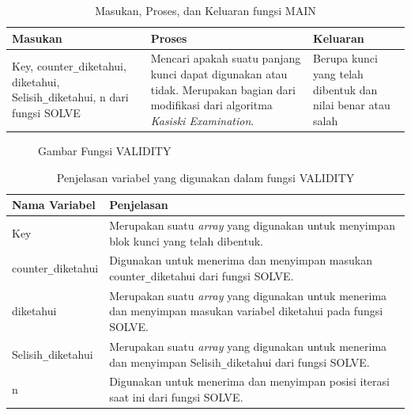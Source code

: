 		\begin{table}[H]
	 	\caption{Masukan, Proses, dan Keluaran fungsi MAIN}
		\begin{tabular}   {|p{3cm}|p{4cm}|p{2cm}|}\hline
		Masukan&Proses&Keluaran \\ \hline
		Key, counter\verb|_|diketahui, diketahui, Selisih\verb|_|diketahui, n dari fungsi SOLVE&Mencari apakah suatu panjang kunci dapat digunakan atau tidak. Merupakan bagian dari modifikasi dari algoritma \textit{Kasiski Examination}. &Berupa kunci yang telah dibentuk dan nilai benar atau salah\\ \hline
		\end{tabular}%
		\label{tab:iomain}
	\end{table}
	
 \begin{figure}[H]
		\centering
		\caption{Gambar Fungsi VALIDITY}
		\label{fig:validity}
	\end{figure}
	
	 \begin{table}[H]
	 	\caption{Penjelasan variabel yang digunakan dalam fungsi VALIDITY}
		\begin{tabular}   {|p{3cm}|p{6cm}|}\hline
		Nama Variabel&Penjelasan \\ \hline
		Key&Merupakan suatu \textit{array} yang digunakan untuk menyimpan blok kunci yang telah dibentuk. \\ \hline
		counter\verb|_|diketahui&Digunakan untuk menerima dan menyimpan masukan counter\verb|_|diketahui dari fungsi SOLVE.\\ \hline
		diketahui&Merupakan suatu \textit{array} yang digunakan untuk menerima dan menyimpan masukan variabel diketahui pada fungsi SOLVE. \\ \hline
		Selisih\verb|_|diketahui&Merupakan suatu \textit{array} yang digunakan untuk menerima dan menyimpan Selisih\verb|_|diketahui dari fungsi SOLVE. \\ \hline
		n&Digunakan untuk menerima dan menyimpan posisi iterasi saat ini dari fungsi SOLVE. \\ \hline
		\end{tabular}%
		\label{tab:solvar}
	\end{table}